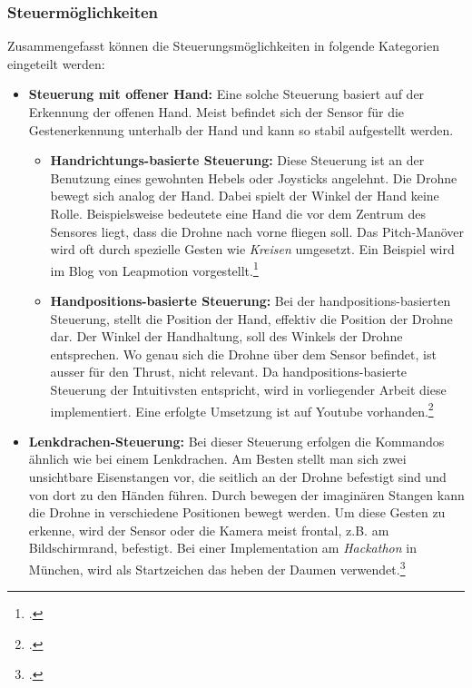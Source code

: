 \subsubsection{Steuermöglichkeiten}
Zusammengefasst können die Steuerungsmöglichkeiten in folgende Kategorien eingeteilt werden:
\begin{itemize}

	\item \textbf{Steuerung mit offener Hand:}
	Eine solche Steuerung basiert auf der Erkennung der offenen Hand.
	Meist befindet sich der Sensor für die Gestenerkennung unterhalb der Hand und kann so stabil aufgestellt werden.
	
		\begin{itemize}
			
			\item \textbf{Handrichtungs-basierte Steuerung:}
			Diese Steuerung ist an der Benutzung eines gewohnten Hebels oder Joysticks angelehnt. Die Drohne bewegt sich analog der Hand. Dabei spielt der Winkel der Hand keine Rolle.
			Beispielsweise bedeutete eine Hand die vor dem Zentrum des Sensores liegt, dass die Drohne nach vorne fliegen soll. Das Pitch-Manöver wird oft durch spezielle Gesten wie \textit{Kreisen} umgesetzt.
			Ein Beispiel wird im Blog von Leapmotion vorgestellt.\footcite{The_Beginning_of_a_Drone_Revolution_Leap_Motion_Blog_2015-04-29}

			\item \textbf{Handpositions-basierte Steuerung:} 
			Bei der handpositions-basierten Steuerung, stellt die Position der Hand, effektiv die Position der Drohne dar. Der Winkel der Handhaltung, soll des Winkels der Drohne entsprechen.
			Wo genau sich die Drohne über dem Sensor befindet, ist ausser für den Thrust, nicht relevant.
			Da handpositions-basierte Steuerung der Intuitivsten entspricht, wird in vorliegender Arbeit diese implementiert.
			Eine erfolgte Umsetzung ist auf Youtube vorhanden.\footcite{Flying_the_Crazyflie_with_Leap_Motion_YouTube_2015-04-29}
		\end{itemize}

	\item \textbf{Lenkdrachen-Steuerung:} 
	Bei dieser Steuerung erfolgen die Kommandos ähnlich wie bei einem Lenkdrachen.
	Am Besten stellt man sich zwei unsichtbare Eisenstangen vor, die seitlich an der Drohne befestigt sind und von dort zu den Händen führen. Durch bewegen der imaginären Stangen kann die Drohne in verschiedene Positionen bewegt werden.
	Um diese Gesten zu erkenne, wird der Sensor oder die Kamera meist frontal, z.B. am Bildschirmrand, befestigt.
	Bei einer Implementation am \textit{Hackathon} in München, wird als Startzeichen das heben der Daumen verwendet.\footcite{Drones_Fly_Hands_Free_with_Gestural_Technology_2015-04-29}
	

\end{itemize}
